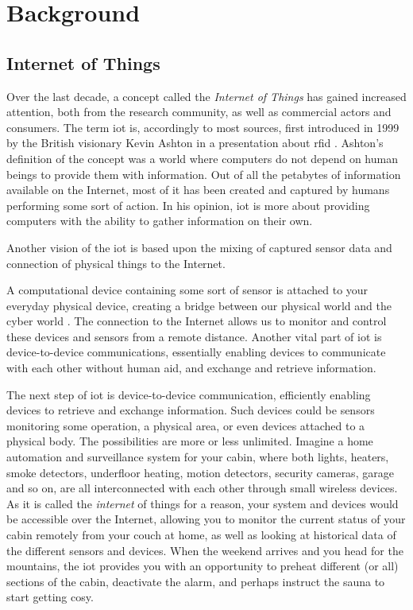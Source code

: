 \chapter{Background}
\label{chp:background}

\section{Internet of Things}

Over the last decade, a concept called the \emph{Internet of Things} has gained increased attention, both from the research community, as well as commercial actors and consumers. The term \gls{iot} is, accordingly to most sources, first introduced in 1999 by the British visionary Kevin Ashton in a presentation about \gls{rfid} \cite{iot-phrase-2} \cite{iot-phrase-1}. Ashton's definition of the concept was a world where computers do not depend on human beings to provide them with information. Out of all the petabytes of information available on the Internet, most of it has been created and captured by humans performing some sort of action. In his opinion, \gls{iot} is more about providing computers with the ability to gather information on their own.



Another vision of the \gls{iot} is based upon the mixing of captured sensor data and connection of physical things to the Internet. 

A computational device containing some sort of sensor is attached to your everyday physical device, creating a bridge between our physical world and the cyber world \cite{Kopetz2011}. The connection to the Internet allows us to monitor and control these devices and sensors from a remote distance. Another vital part of \gls{iot} is device-to-device communications, essentially enabling devices to communicate with each other without human aid, and exchange and retrieve information.



The next step of \gls{iot} is device-to-device communication, efficiently enabling devices to retrieve and exchange information. Such devices could be sensors monitoring some operation, a physical area, or even devices attached to a physical body. The possibilities are more or less unlimited. Imagine a home automation and surveillance system for your cabin, where both lights, heaters, smoke detectors, underfloor heating, motion detectors, security cameras, garage and so on, are all interconnected with each other through small wireless devices.  As it is called the \emph{internet} of things for a reason, your system and devices would be accessible over the Internet, allowing you to monitor the current status of your cabin remotely from your couch at home, as well as looking at historical data of the different sensors and devices. When the weekend arrives and you head for the mountains, the \gls{iot} provides you with an opportunity to preheat different (or all) sections of the cabin, deactivate the alarm, and perhaps instruct the sauna to start getting cosy. 

